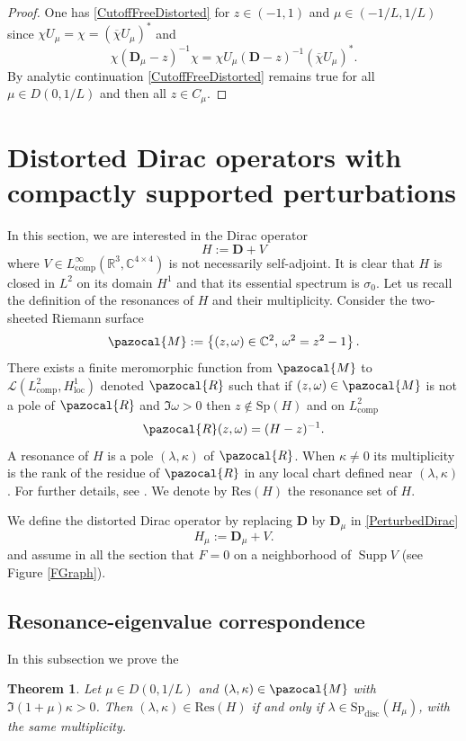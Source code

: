 \documentclass[a4paper, 12pt]{amsart}
\numberwithin{equation}{section}
\newtheorem{theorem}{Theorem}
\newcommand{\C}{\mathbb{C}} %
\newcommand{\R}{\mathbb{R}} %
\newcommand{\loc}{\mathrm{loc}} %
\newcommand{\comp}{\mathrm{comp}} %
\newcommand{\Sp}{\mathrm{Sp}} %
\newcommand{\disc}{\mathrm{disc}} %
\newcommand{\Res}{\mathrm{Res}} %
\newcommand{\lcb}{\left\lbrace} %
\newcommand{\rcb}{\right\rbrace} %
\newcommand{\Dvec}{\mathbf{D}}
\newcommand{\Lcal}{\mathcal{L}}
\newcommand{\Mpaz}{\pazocal{M}}
\newcommand{\Rpaz}{\pazocal{R}}
\DeclareMathOperator{\Supp}{\mathrm{Supp}} %
\begin{document}
\begin{proof}
    One has \eqref{CutoffFreeDistorted} for $z\in(-1,1)$ and $\mu\in(-1/L,1/L)$ since $\chi U_\mu=\chi=(\overline{\chi}U_\mu)^*$ and
    \[\chi(\Dvec_\mu-z)^{-1}\chi=\chi U_\mu(\Dvec-z)^{-1}(\overline{\chi}U_\mu)^*.\]
    By analytic continuation \eqref{CutoffFreeDistorted} remains true for all $\mu\in D(0,1/L)$ and then all $z\in C_\mu$.
\end{proof}

\section{Distorted Dirac operators with compactly supported perturbations}\label{Section3}

In this section, we are interested in the Dirac operator 
\begin{equation}\label{PerturbedDirac}
    H:=\Dvec+V
\end{equation}
where $V\in L^\infty_\comp(\R^3,\C^{4\times4})$ is not necessarily self-adjoint. It is clear that $H$ is closed in $L^2$ on its domain $H^1$ and that its essential spectrum is $\sigma_0$. Let us recall the definition of the resonances of $H$ and their multiplicity. Consider the two-sheeted Riemann surface
\begin{equation*}
    \Mpaz:=\lcb(z,\omega)\in\C^2\mbox{, } \omega^2=z^2-1\rcb.
\end{equation*}
There exists a finite meromorphic function from $\Mpaz$ to $\Lcal(L^2_\comp,H^1_\loc)$ denoted $\Rpaz$ such that if $(z,\omega)\in\Mpaz$ is not a pole of $\Rpaz$ and $\Im\omega>0$ then $z\not\in\Sp(H)$ and on $L^2_\comp$ 
\begin{equation}\label{ResolventContinuation}
    \Rpaz(z,\omega)=(H-z)^{-1}.
\end{equation} 
A resonance of $H$ is a pole $(\lambda,\kappa)$ of $\Rpaz$. When $\kappa\not=0$ its multiplicity is the rank of the residue of $\Rpaz$ in any local chart defined near $(\lambda,\kappa)$. For further details, see \cite{Du25}. We denote by $\Res(H)$ the resonance set of $H$.

We define the distorted Dirac operator by replacing $\Dvec$ by $\Dvec_\mu$ in \eqref{PerturbedDirac}
\begin{equation*}
    H_\mu:=\Dvec_\mu+V.
\end{equation*}
and assume in all the section that $F=0$ on a neighborhood of $\Supp V$ (see Figure \ref{FGraph}). 

\subsection{Resonance-eigenvalue correspondence} In this subsection we prove the  
\begin{theorem}\label{LinkResonanceEigenvalue}
     Let $\mu\in D(0,1/L)$ and $(\lambda,\kappa)\in\Mpaz$ with $\Im(1+\mu)\kappa>0$. Then $(\lambda,\kappa)\in\Res(H)$ if and only if $\lambda\in\Sp_\disc(H_\mu)$, with the same multiplicity.
\end{theorem}
\end{document}
